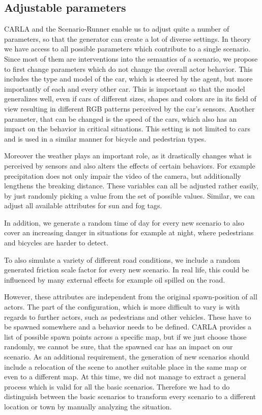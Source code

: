 \documentclass[conference, a4paper, 11pt]{IEEEtran}
\begin{document}
\subsection{Adjustable parameters}

CARLA and the Scenario-Runner enable us to adjust quite a number of parameters, so that the generator can create a lot of diverse settings. In theory we have access to all possible parameters which contribute to a single scenario. Since most of them are interventions into the semantics of a scenario, we propose to first change parameters which do not change the overall actor behavior.
This includes the type and model of the car, which is steered by the agent, but more importantly of each and every other car.
This is important so that the model generalizes well, even if cars of different sizes, shapes and colors are in its field of view resulting in different RGB patterns perceived by the car's sensors.
Another parameter, that can be changed is the speed of the cars, which also has an impact on the behavior in critical situations.
This setting is not limited to cars and is used in a similar manner for bicycle and pedestrian types.

Moreover the weather plays an important role, as it drastically changes what is perceived by sensors and also alters the effects of certain behaviors. For example precipitation does not only impair the video of the camera, but additionally lengthens the breaking distance.
These variables can all be adjusted rather easily, by just randomly picking a value from the set of possible values.
Similar, we can adjust all available attributes for sun and fog tags.

In addition, we generate a random time of day for every new scenario to also cover an increasing danger in situations for example at night, where pedestrians and bicycles are harder to detect.

To also simulate a variety of different road conditions, we include a random generated friction scale factor for every new scenario. In real life, this could be influenced by many external effects for example oil spilled on the road.

However, these attributes are independent from the original spawn-position of all actors. 
The part of the configuration, which is more difficult to vary is with regards to further actors, such as pedestrians and other vehicles. These have to be spawned somewhere and a behavior needs to be defined.
CARLA provides a list of possible spawn points across a specific map, but if we just choose those randomly, we cannot be sure, that the spawned car has an impact on our scenario.
As an additional requirement, the generation of new scenarios should include a relocation of the scene to another suitable place in the same map or even to a different map.
At this time, we did not manage to extract a general process which is valid for all the basic scenarios. Therefore we had to do distinguish between the basic scenarios to transform every scenario to a different location or town by manually analyzing the situation.
\end{document}

